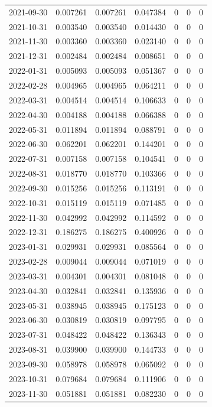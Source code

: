 \documentclass[conference,onecolumn]{IEEEtran}
\begin{document}
\begin{longtable}{|c|c|c|c|c|c|c|}
2021-09-30 & 0.007261 & 0.007261 & 0.047384 & 0 & 0 & 0 \\
2021-10-31 & 0.003540 & 0.003540 & 0.014430 & 0 & 0 & 0 \\
2021-11-30 & 0.003360 & 0.003360 & 0.023140 & 0 & 0 & 0 \\
2021-12-31 & 0.002484 & 0.002484 & 0.008651 & 0 & 0 & 0 \\
2022-01-31 & 0.005093 & 0.005093 & 0.051367 & 0 & 0 & 0 \\
2022-02-28 & 0.004965 & 0.004965 & 0.064211 & 0 & 0 & 0 \\
2022-03-31 & 0.004514 & 0.004514 & 0.106633 & 0 & 0 & 0 \\
2022-04-30 & 0.004188 & 0.004188 & 0.066388 & 0 & 0 & 0 \\
2022-05-31 & 0.011894 & 0.011894 & 0.088791 & 0 & 0 & 0 \\
2022-06-30 & 0.062201 & 0.062201 & 0.144201 & 0 & 0 & 0 \\
2022-07-31 & 0.007158 & 0.007158 & 0.104541 & 0 & 0 & 0 \\
2022-08-31 & 0.018770 & 0.018770 & 0.103366 & 0 & 0 & 0 \\
2022-09-30 & 0.015256 & 0.015256 & 0.113191 & 0 & 0 & 0 \\
2022-10-31 & 0.015119 & 0.015119 & 0.071485 & 0 & 0 & 0 \\
2022-11-30 & 0.042992 & 0.042992 & 0.114592 & 0 & 0 & 0 \\
2022-12-31 & 0.186275 & 0.186275 & 0.400926 & 0 & 0 & 0 \\
2023-01-31 & 0.029931 & 0.029931 & 0.085564 & 0 & 0 & 0 \\
2023-02-28 & 0.009044 & 0.009044 & 0.071019 & 0 & 0 & 0 \\
2023-03-31 & 0.004301 & 0.004301 & 0.081048 & 0 & 0 & 0 \\
2023-04-30 & 0.032841 & 0.032841 & 0.135936 & 0 & 0 & 0 \\
2023-05-31 & 0.038945 & 0.038945 & 0.175123 & 0 & 0 & 0 \\
2023-06-30 & 0.030819 & 0.030819 & 0.097795 & 0 & 0 & 0 \\
2023-07-31 & 0.048422 & 0.048422 & 0.136343 & 0 & 0 & 0 \\
2023-08-31 & 0.039900 & 0.039900 & 0.144733 & 0 & 0 & 0 \\
2023-09-30 & 0.058978 & 0.058978 & 0.065092 & 0 & 0 & 0 \\
2023-10-31 & 0.079684 & 0.079684 & 0.111906 & 0 & 0 & 0 \\
2023-11-30 & 0.051881 & 0.051881 & 0.082230 & 0 & 0 & 0 \\

\end{longtable}
\end{document}
